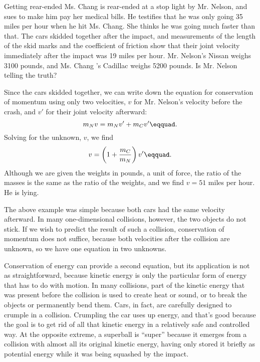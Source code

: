 \begin{eg}{Getting rear-ended}
\egquestion Ms. Chang is rear-ended at a stop light by Mr.
Nelson, and sues to make him pay her medical bills. He
testifies that he was only going 35 miles per hour when he
hit Ms. Chang. She thinks he was going much faster than
that. The cars skidded together after the impact, and
measurements of the length of the skid marks and the
coefficient of friction show that their joint velocity
immediately after the impact was 19 miles per hour. Mr.
Nelson's Nissan weighs 3100 pounds, and Ms. Chang 's
Cadillac weighs 5200 pounds. Is Mr. Nelson telling the truth?

\eganswer Since the cars skidded together, we can write down
the equation for conservation of momentum using only two
velocities, $v$ for Mr. Nelson's velocity before the crash,
and $v'$ for their joint velocity afterward:
\begin{equation*}
                m_N v  =  m_N v' + m_C v'\eqquad.
\end{equation*}
Solving for the unknown, $v$, we find
\begin{equation*}
                v  =   \left(1+\frac{m_C}{m_N}\right)v'\eqquad.
\end{equation*}
Although we are given the weights in pounds, a unit of
force, the ratio of the masses is the same as the ratio of
the weights, and we find $v=51$ miles per hour. He is lying.
\end{eg}

The above example was simple because both cars had the same
velocity afterward. In many one-dimensional collisions,
however, the two objects do not stick. If we wish to predict
the result of such a collision, conservation of momentum
does not suffice, because both velocities after the
collision are unknown, so we have one equation in two unknowns.

Conservation of energy can provide a second equation, but
its application is not as straightforward, because kinetic
energy is only the particular form of energy that has to do
with motion. In many collisions, part of the kinetic energy
that was present before the collision is used to create heat
or sound, or to break the objects or permanently bend them.
Cars, in fact, are carefully designed to crumple in a
collision. Crumpling the car uses up energy, and that's good
because the goal is to get rid of all that kinetic energy in
a relatively safe and controlled way. At the opposite
extreme, a superball is ``super'' because it emerges from a
collision with almost all its original kinetic energy,
having only stored it briefly as potential energy while it
was being squashed by the impact.

